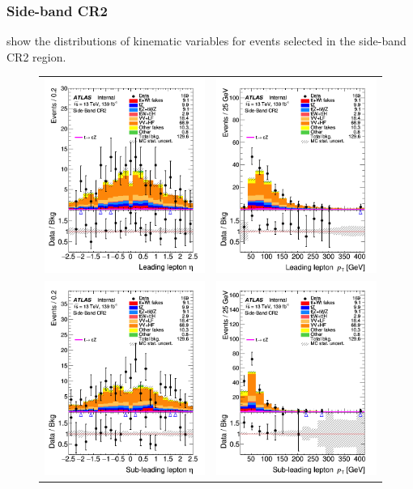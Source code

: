 \clearpage
\FloatBarrier
\subsubsection{Side-band CR2}
 show the distributions 
of kinematic variables for events selected in the side-band CR2 region.

\begin{figure}[!htbp]
	\centering
	\begin{tabular}{cc}
		\includegraphics[width=.32\textwidth]{Chapters/CH6/figures/SBCR2/lep1_eta} &
		\includegraphics[width=.32\textwidth]{Chapters/CH6/figures/SBCR2/lep1_pt} \\
		\includegraphics[width=.32\textwidth]{Chapters/CH6/figures/SBCR2/lep2_eta} &
		\includegraphics[width=.32\textwidth]{Chapters/CH6/figures/SBCR2/lep2_pt} \\

\end{tabular}
\end{figure}
